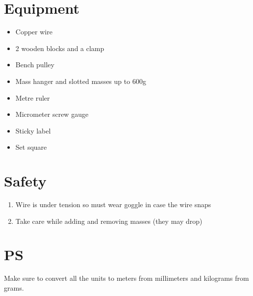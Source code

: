 \documentclass[12pt]{article}
\begin{document}
    \section*{Equipment}
    \begin{itemize}
        \item Copper wire
        \item 2 wooden blocks and a clamp
        \item Bench pulley
        \item Mass hanger and slotted masses up to 600g
        \item Metre ruler
        \item Micrometer screw gauge
        \item Sticky label
        \item Set square
    \end{itemize}

    \section*{Safety}
    \begin{enumerate}
        \item Wire is under tension so must wear goggle in case the wire snaps
        \item Take care while adding and removing masses (they may drop)
    \end{enumerate}

    \section*{PS}
    Make sure to convert all the units to meters from millimeters and kilograms
    from grams.
\end{document}
